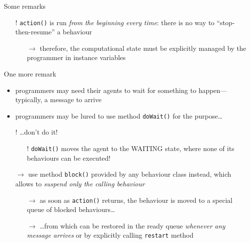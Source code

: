\documentclass{beamer}\mode<presentation>{\usetheme{AMSCesenaPurpleAndGold}}
\begin{document}
\begin{frame}[c,allowframebreaks]
\begin{block}{Some remarks}
\begin{itemize}
\begin{itemize}
            \end{itemize}
            \item[!] \texttt{action()} is run \emph{from the beginning every time}: there is no way to ``stop-then-resume'' a behaviour
            \begin{itemize}
                \item[$\rightarrow$] therefore, the computational state must be explicitly managed by the programmer in instance variables%
            \end{itemize}
        \end{itemize}
    \end{block}
    \begin{block}{One more remark}
        \begin{itemize}
            \item programmers may need their agents to wait for something to happen---typically, a message to arrive
            \item programmers may be lured to use method \texttt{doWait()} for the purpose\ldots
            \item[!] \ldots don't do it!
            \begin{itemize}
                \item[!] \texttt{doWait()} moves the agent to the WAITING state, where none of its behaviours can be executed!
            \end{itemize}
            \item[$\rightarrow$] use method \alert{\texttt{block()}} provided by any behaviour class instead, which allows to \emph{suspend only the calling behaviour}
            \begin{itemize}
                \item[$\rightarrow$] as soon as \texttt{action()} returns, the behaviour is moved to a special queue of blocked behaviours\ldots
                \item[$\rightarrow$] \ldots from which can be restored in the ready queue \emph{whenever any message arrives} or by explicitly calling \texttt{restart} method
            \end{itemize}
        \end{itemize}
    \end{block}
\end{frame}
\end{document}
